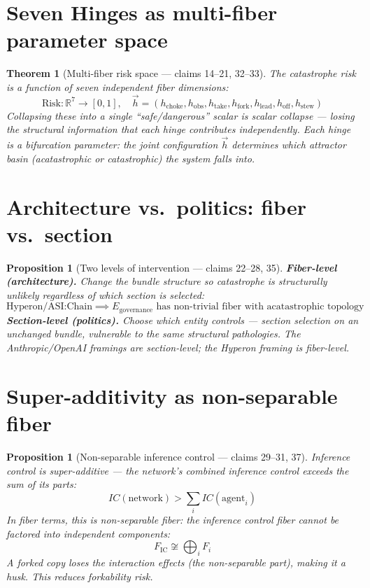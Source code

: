 \documentclass[11pt,a4paper]{article}
\newtheorem{theorem}[definition]{Theorem}
\newtheorem{proposition}[definition]{Proposition}
\begin{document}
\section{Seven Hinges as multi-fiber parameter space}

\begin{theorem}[Multi-fiber risk space --- claims 14--21, 32--33]
\label{thm:hinges}
The catastrophe risk is a function of seven independent fiber dimensions:
\[
  \text{Risk}: \mathbb{R}^7 \to [0,1], \quad
  \vec{h} = (h_{\text{choke}}, h_{\text{obs}}, h_{\text{take}},
  h_{\text{fork}}, h_{\text{lead}}, h_{\text{off}}, h_{\text{stew}})
\]
Collapsing these into a single ``safe/dangerous'' scalar is
scalar collapse --- losing the structural information that each hinge
contributes independently. Each hinge is a bifurcation parameter:
the joint configuration $\vec{h}$ determines which attractor basin
(acatastrophic or catastrophic) the system falls into.
\end{theorem}

\section{Architecture vs.\ politics: fiber vs.\ section}

\begin{proposition}[Two levels of intervention --- claims 22--28, 35]
\label{prop:fiber_section}
\textbf{Fiber-level (architecture).} Change the bundle structure so
catastrophe is structurally unlikely regardless of which section
is selected:
\[
  \text{Hyperon/ASI:Chain} \implies E_{\text{governance}} \text{ has
  non-trivial fiber with acatastrophic topology}
\]
\textbf{Section-level (politics).} Choose which entity controls ---
section selection on an unchanged bundle, vulnerable to the same
structural pathologies. The Anthropic/OpenAI framings are
section-level; the Hyperon framing is fiber-level.
\end{proposition}

\section{Super-additivity as non-separable fiber}

\begin{proposition}[Non-separable inference control --- claims 29--31, 37]
\label{prop:superadd}
Inference control is super-additive --- the network's combined
inference control exceeds the sum of its parts:
\[
  IC(\text{network}) > \sum_i IC(\text{agent}_i)
\]
In fiber terms, this is non-separable fiber: the inference control
fiber cannot be factored into independent components:
\[
  F_{\text{IC}} \not\cong \bigoplus_i F_i
\]
A forked copy loses the interaction effects (the non-separable
part), making it a husk. This reduces forkability risk.
\end{proposition}
\end{document}
